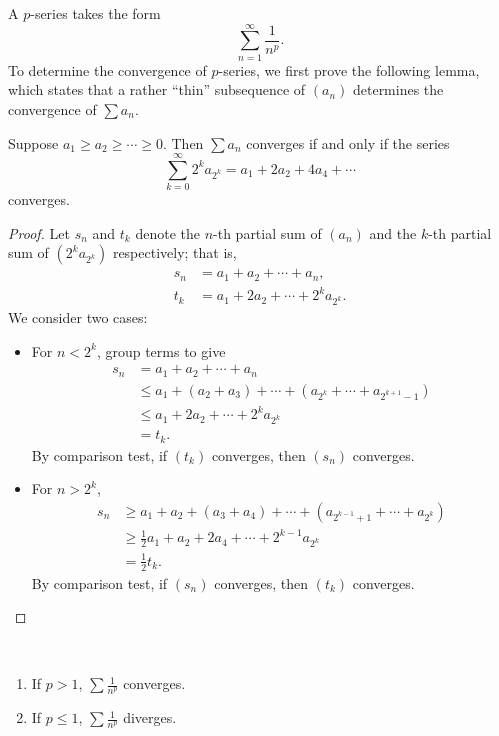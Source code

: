 \begin{example}[$p$-series]
A $p$-series takes the form
\[\sum_{n=1}^{\infty}\frac{1}{n^p}.\]
To determine the convergence of $p$-series, we first prove the following lemma, which states that a rather ``thin'' subsequence of $(a_n)$ determines the convergence of $\sum a_n$.

\begin{lemma*}
Suppose $a_1\ge a_2\ge\cdots\ge0$. Then $\sum a_n$ converges if and only if the series
\[\sum_{k=0}^{\infty}2^ka_{2^k}=a_1+2a_2+4a_4+\cdots\]
converges.
\end{lemma*}

\begin{proof}
Let $s_n$ and $t_k$ denote the $n$-th partial sum of $(a_n)$ and the $k$-th partial sum of $(2^ka_{2^k})$ respectively; that is,
\begin{align*}
s_n&=a_1+a_2+\cdots+a_n,\\
t_k&=a_1+2a_2+\cdots+2^ka_{2^k}.
\end{align*}
We consider two cases:
\begin{itemize}
\item For $n<2^k$, group terms to give
\begin{align*}
s_n&=a_1+a_2+\cdots+a_n\\
&\le a_1+(a_2+a_3)+\cdots+(a_{2^k}+\cdots+a_{2^{k+1}-1})\\
&\le a_1+2a_2+\cdots+2^ka_{2^k}\\
&=t_k.
\end{align*}
By comparison test, if $(t_k)$ converges, then $(s_n)$ converges.

\item For $n>2^k$,
\begin{align*}
s_n&\ge a_1+a_2+(a_3+a_4)+\cdots+(a_{2^{k-1}+1}+\cdots+a_{2^k})\\
&\ge\frac{1}{2}a_1+a_2+2a_4+\cdots+2^{k-1}a_{2^k}\\
&=\frac{1}{2}t_k.
\end{align*}
By comparison test, if $(s_n)$ converges, then $(t_k)$ converges.
\end{itemize}
\end{proof}

\begin{proposition*}[$p$-test] \
\begin{enumerate}[label=(\roman*)]
\item If $p>1$, $\sum\frac{1}{n^p}$ converges.
\item If $p\le1$, $\sum\frac{1}{n^p}$ diverges.
\end{enumerate}
\end{proposition*}


\end{example}
